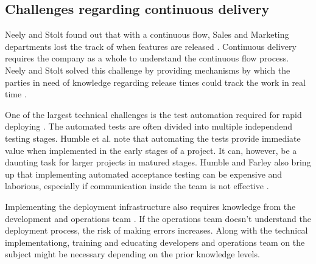 \documentclass[english]{tktltiki2}
\theoremstyle{definition}
\theoremstyle{remark}
\begin{document}

\subsection{Challenges regarding continuous delivery}
Neely and Stolt found out that with a continuous flow, Sales and Marketing departments lost the track of when features are released \cite{neely2013continuous}. Continuous delivery requires the company as a whole to understand the continuous flow process. Neely and Stolt solved this challenge by providing mechanisms by which the parties in need of knowledge regarding release times could track the work in real time \cite{neely2013continuous}. 

One of the largest technical challenges is the test automation required for rapid deploying \cite{humble2006deployment, cdbook}. The automated tests are often divided into multiple independend testing stages. Humble et al. note that automating the tests provide immediate value when implemented in the early stages of a project. It can, however, be a daunting task for larger projects in matured stages. Humble and Farley also bring up that implementing automated acceptance testing can be expensive and laborious, especially if communication inside the team is not effective \cite{cdbook}. 

Implementing the deployment infrastructure also requires knowledge from the development and operations team \cite{cdbook}. If the operations team doesn't understand the deployment process, the risk of making errors increases. Along with the technical implementationg, training and educating developers and operations team on the subject might be necessary depending on the prior knowledge levels.
\end{document}
